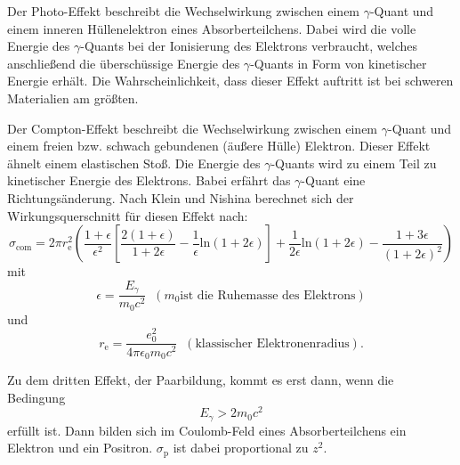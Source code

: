 \documentclass[
  bibliography=totoc,     %
  captions=tableheading,  %
  titlepage=firstiscover, %
]{scrartcl}
\begin{document}
\noindent
Der Photo-Effekt beschreibt die Wechselwirkung zwischen einem $\gamma$-Quant
und einem inneren Hüllenelektron eines Absorberteilchens. Dabei wird die volle
Energie des $\gamma$-Quants bei der Ionisierung des Elektrons verbraucht, welches
anschließend die überschüssige Energie des $\gamma$-Quants in Form von kinetischer
Energie erhält. Die Wahrscheinlichkeit, dass dieser Effekt auftritt ist bei schweren
Materialien am größten.

\noindent
Der Compton-Effekt beschreibt die Wechselwirkung zwischen einem $\gamma$-Quant
und einem freien bzw. schwach gebundenen (äußere Hülle) Elektron.
Dieser Effekt ähnelt einem elastischen Stoß. Die Energie des $\gamma$-Quants wird zu
einem Teil zu kinetischer Energie des Elektrons. Babei erfährt das $\gamma$-Quant
eine Richtungsänderung.
Nach Klein und Nishina berechnet sich der Wirkungsquerschnitt für diesen Effekt
nach:
\begin{equation}
  \sigma_\mathup{com} = 2 \pi r_\mathup{e}^2 \left( \frac{1 + \epsilon}{\epsilon^2} \left[ \frac{2 ( 1 + \epsilon)}{1 + 2 \epsilon}-\frac{1}{\epsilon} \mathup{ln}
  ( 1 + 2 \epsilon) \right] + \frac{1}{2 \epsilon} \mathup{ln} ( 1 + 2 \epsilon) - \frac{1 + 3 \epsilon}{( 1 + 2 \epsilon)^2} \right)
  \label{eqn:sigma_theo}
\end{equation}
mit
\begin{equation}
  \epsilon = \frac{E_\gamma}{m_0 c^2} \;\; (m_0 \text{ist die Ruhemasse des Elektrons})
\end{equation}
und
\begin{equation}
  r_\mathup{e} = \frac{e_0^2}{4 \pi \epsilon_0 m_0 c^2} \;\; (\text{klassischer Elektronenradius}).
\end{equation}

\noindent
Zu dem dritten Effekt, der Paarbildung, kommt es erst dann, wenn die Bedingung
\begin{equation}
  E_\gamma > 2 m_0 c^2
\end{equation}
erfüllt ist. Dann bilden sich im Coulomb-Feld eines Absorberteilchens ein Elektron
und ein Positron. $\sigma_\mathup{p}$ ist dabei proportional zu $z^2$.
\end{document}
